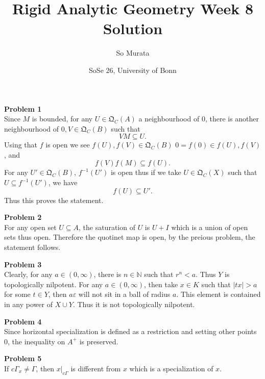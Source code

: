\documentclass[10pt]{article}
\title{Rigid Analytic Geometry Week 8 Solution}
\author{So Murata}
\date{SoSe 26, University of Bonn}
\newcommand{\N}[0]{\mathbb{N}}
\newcommand{\Qc}[0]{\mathfrak{Q}_C}
\begin{document}
\maketitle

\par\textbf{Problem 1}\\
Since $M$ is bounded, for any $U\in\Qc(A)$ a neighbourhood of $0$, there is another neighbourhood of $0,V\in\Qc(B)$ such that  
\begin{equation*}
    VM\subseteq U.
\end{equation*}
Using that $f$ is open we see $f(U),f(V)\in\Qc(B)$ $0 = f(0)\in f(U),f(V)$, and 
\begin{equation*}
    f(V)f(M) \subseteq f(U).
\end{equation*}
For any $U'\in\Qc(B)$, $f^{-1}(U')$ is open thus if we take $U\in\Qc(X)$ such that $U\subseteq f^{-1}(U')$, we have 
\begin{equation*}
    f(U)\subseteq U'.
\end{equation*}
Thus this proves the statement.
\par\textbf{Problem 2}\\
For any open set $U\subseteq A$, the saturation of $U$ is $U+I$ which is a union of open sets thus open. Therefore the quotinet map is open, by the preious problem, the statement follows.
\par\textbf{Problem 3}\\
Clearly, for any $a\in (0,\infty)$, there is $n\in\N$ such that $r^n<a$. Thus $Y$ is topologically nilpotent. For any $a\in (0,\infty)$, then take $x\in K$ such that $\vert tx\vert >a$ for some $t\in Y$, then $a\varepsilon$ will not sit in a ball of radius $a$. This element is contained in any power of $X\cup Y$. Thus it is not topologically nilpotent.
\par\textbf{Problem 4}\\
Since horizontal specialization is defined as a restriction and setting other points $0$, the inequality on $A^+$ is preserved.
\par\textbf{Problem 5}\\
If $c\Gamma_x\not=\Gamma$, then $x|_{c\Gamma}$ is different from $x$ which is a specialization of $x$.
\end{document}
